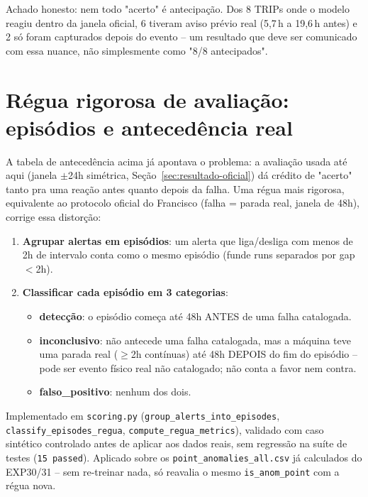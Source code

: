 \documentclass[11pt,a4paper]{article}
\begin{document}
Achado honesto: nem todo "acerto" é antecipação. Dos 8 TRIPs onde o
modelo reagiu dentro da janela oficial, 6 tiveram aviso prévio real
(5,7\,h a 19,6\,h antes) e 2 só foram capturados depois do evento --
um resultado que deve ser comunicado com essa nuance, não simplesmente
como "8/8 antecipados".

\section{Régua rigorosa de avaliação: episódios e antecedência real}
\label{sec:regua-rigorosa}

A tabela de antecedência acima já apontava o problema: a avaliação
usada até aqui (janela $\pm$24h simétrica, Seção~\ref{sec:resultado-oficial})
dá crédito de "acerto" tanto pra uma reação antes quanto depois da
falha. Uma régua mais rigorosa, equivalente ao protocolo oficial do
Francisco (falha = parada real, janela de 48h), corrige essa
distorção:

\begin{enumerate}
  \item \textbf{Agrupar alertas em episódios}: um alerta que
    liga/desliga com menos de 2h de intervalo conta como o mesmo
    episódio (funde runs separados por gap $<$2h).
  \item \textbf{Classificar cada episódio em 3 categorias}:
  \begin{itemize}
    \item \textbf{detecção}: o episódio começa até 48h ANTES de uma
      falha catalogada.
    \item \textbf{inconclusivo}: não antecede uma falha catalogada,
      mas a máquina teve uma parada real ($\geq$2h contínuas) até 48h
      DEPOIS do fim do episódio -- pode ser evento físico real não
      catalogado; não conta a favor nem contra.
    \item \textbf{falso\_positivo}: nenhum dos dois.
  \end{itemize}
\end{enumerate}

Implementado em \texttt{scoring.py}
(\texttt{group\_alerts\_into\_episodes}, \texttt{classify\_episodes\_regua},
\texttt{compute\_regua\_metrics}), validado com caso sintético
controlado antes de aplicar aos dados reais, sem regressão na suíte de
testes (\texttt{15 passed}). Aplicado sobre os
\texttt{point\_anomalies\_all.csv} já calculados do EXP30/31 -- sem
re-treinar nada, só reavalia o mesmo \texttt{is\_anom\_point} com a
régua nova.
\end{document}
